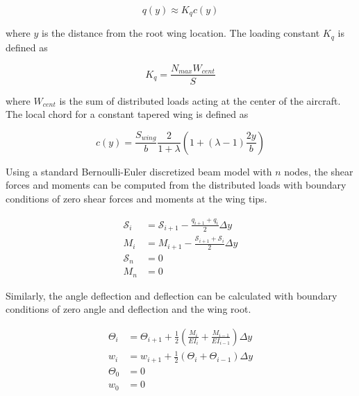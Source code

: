 \documentclass[]{aiaa-tc}%
\begin{document}
\begin{equation}
    \label{e:wingloading}
    q(y) \approx K_q c(y) 
\end{equation}

where $y$ is the distance from the root wing location. The loading constant $K_q$\cite{bending} is defined as

\begin{equation}
    \label{e:kq}
    K_q = \frac{N_{max}W_{cent}}{S}
\end{equation}

where $W_{cent}$ is the sum of distributed loads acting at the center of the aircraft. The local chord for a constant tapered wing\cite{bending} is defined as 

\begin{equation}
    \label{e:localchord}
    c(y) = \frac{S_{wing}}{b} \frac{2}{1+\lambda} \left( 1 + (\lambda - 1) \frac{2y}{b} \right)
\end{equation}

Using a standard Bernoulli-Euler discretized beam model with $n$ nodes, the shear forces and moments can be computed from the distributed loads with boundary conditions of zero shear forces and moments at the wing tips.\cite{bending}

\begin{align}
    \label{e:shear}
    \mathcal{S}_i &= \mathcal{S}_{i+1} - \frac{q_{i+1} + q_i}{2}\Delta y \\
    \label{e:moment}
    M_i &= M_{i+1} - \frac{\mathcal{S}_{i+1} + \mathcal{S}_i}{2}\Delta y \\
    \label{e:shearboundary}
    \mathcal{S}_n &= 0 \\
    \label{e:momentboundary}
    M_n &= 0
\end{align}

Similarly, the angle deflection and deflection can be calculated with boundary conditions of zero angle and deflection and the wing root.\cite{bending}

\begin{align}
    \label{e:angle}
    \Theta_{i} &= \Theta_{i+1} + \frac{1}{2} \left(\frac{M_i}{EI_i} + \frac{M_{i-1}}{EI_{i-1}} \right) \Delta y \\
    \label{e:deflection}
    w_{i} &= w_{i+1} + \frac{1}{2} (\Theta_i + \Theta_{i-1}) \Delta y \\
    \label{e:angleboundary}
    \Theta_0 &= 0 \\
    \label{e:defboundary}
    w_0 &= 0 \\
\end{align}
 
\end{document}

